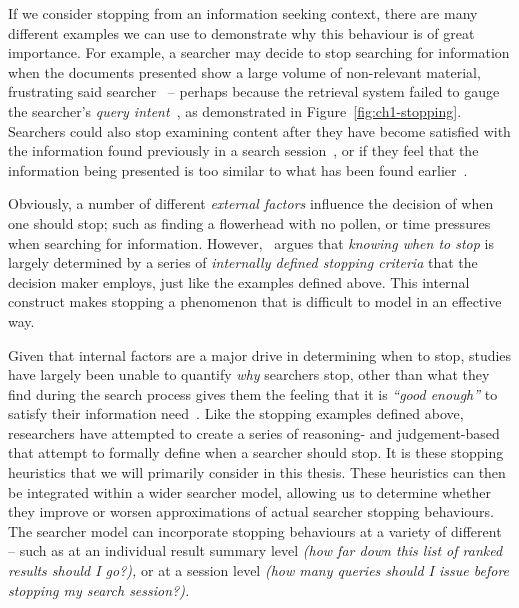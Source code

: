 If we consider stopping from an information seeking context, there are many different examples we can use to demonstrate why this behaviour is of great importance. For example, a searcher may decide to stop searching for information when the documents presented show a large volume of non-relevant material, frustrating said searcher~\citep{cooper1973retrieval_effectiveness_ii} -- perhaps because the retrieval system failed to gauge the searcher's \emph{query intent}~\citep{ashkan2009classifying}, as demonstrated in Figure~\ref{fig:ch1-stopping}. Searchers could also stop examining content after they have become satisfied with the information found previously in a search session~\citep{cooper1973retrieval_effectiveness, gibb1958number_rule, simon1955satiation}, or if they feel that the information being presented is too similar to what has been found earlier~\citep{nickles1995judgment}.

Obviously, a number of different \emph{external factors} influence the decision of when one should stop; such as finding a flowerhead with no pollen, or time pressures when searching for information. However,~\cite{nickles1995judgment} argues that \emph{knowing when to stop} is largely determined by a series of \emph{internally defined stopping criteria} that the decision maker employs, just like the examples defined above. This internal construct makes stopping a phenomenon that is difficult to model in an effective way.

Given that internal factors are a major drive in determining when to stop, studies have largely been unable to quantify \emph{why} searchers stop, other than what they find during the search process gives them the feeling that it is \emph{``good enough''} to satisfy their information need~\citep{zach2005enough_is_enough}. Like the stopping examples defined above, researchers have attempted to create a series of reasoning- and judgement-based  that attempt to formally define when a searcher should stop. It is these stopping heuristics that we will primarily consider in this thesis. These heuristics can then be integrated within a wider searcher model, allowing us to determine whether they improve or worsen approximations of actual searcher stopping behaviours. The searcher model can incorporate stopping behaviours at a variety of different  -- such as at an individual result summary level \emph{(how far down this list of ranked results should I go?),} or at a session level \emph{(how many queries should I issue before stopping my search session?).}

